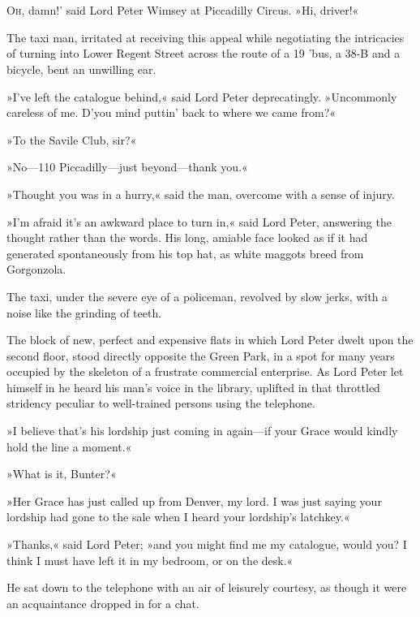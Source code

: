 \chapter[Chapter \thechapter]{}
\lettrine[lines=4,ante=‘]{O}{h}, damn!' said Lord Peter Wimsey at Piccadilly Circus. »Hi, driver!«

\zz
The taxi man, irritated at receiving this appeal while negotiating the intricacies of turning into Lower Regent Street across the route of a 19 'bus, a 38-B and a bicycle, bent an unwilling ear.

»I've left the catalogue behind,« said Lord Peter deprecatingly. »Uncommonly careless of me. D'you mind puttin' back to where we came from?«

»To the Savile Club, sir?«

»No—110 Piccadilly—just beyond—thank you.«

»Thought you was in a hurry,« said the man, overcome with a sense of injury.

»I'm afraid it's an awkward place to turn in,« said Lord Peter, answering the thought rather than the words. His long, amiable face looked as if it had generated spontaneously from his top hat, as white maggots breed from Gorgonzola.

The taxi, under the severe eye of a policeman, revolved by slow jerks, with a noise like the grinding of teeth.

The block of new, perfect and expensive flats in which Lord Peter dwelt upon the second floor, stood directly opposite the Green Park, in a spot for many years occupied by the skeleton of a frustrate commercial enterprise. As Lord Peter let himself in he heard his man's voice in the library, uplifted in that throttled stridency peculiar to well-trained persons using the telephone.

»I believe that's his lordship just coming in again—if your Grace would kindly hold the line a moment.«

»What is it, Bunter?«

»Her Grace has just called up from Denver, my lord. I was just saying your lordship had gone to the sale when I heard your lordship's latchkey.«

»Thanks,« said Lord Peter; »and you might find me my catalogue, would you? I think I must have left it in my bedroom, or on the desk.«

He sat down to the telephone with an air of leisurely courtesy, as though it were an acquaintance dropped in for a chat.

